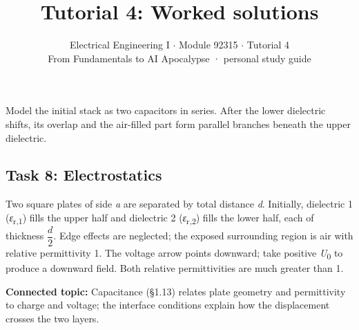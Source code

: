 \documentclass[11pt]{article}
\title{\sffamily\bfseries\color{FAUblue}Tutorial 4: Worked solutions}
\author{Electrical Engineering I \ensuremath{\cdot} Module 92315 \ensuremath{\cdot} Tutorial 4\\[2pt]\small From Fundamentals to AI Apocalypse · personal study guide}
\date{}
\begin{document}
\maketitle
\begingroup\footnotesize\setlength{\parskip}{0pt}\tableofcontents\endgroup
\clearpage

{\large Model the initial stack as two capacitors in series. After the lower dielectric shifts, its overlap and the air-filled part form parallel branches beneath the upper dielectric.}


\begin{keepsection}
\section{Task 8: Electrostatics}

Two square plates of side \textit{a} are separated by total distance \textit{d}. Initially, dielectric 1 (\textit{ε}\textsubscript{r,1}) fills the upper half and dielectric 2 (\textit{ε}\textsubscript{r,2}) fills the lower half, each of thickness {\small\ensuremath{\dfrac{{d}}{2}}}. Edge effects are neglected; the exposed surrounding region is air with relative permittivity 1. The voltage arrow points downward; take positive \textit{U}\textsubscript{0} to produce a downward field. Both relative permittivities are much greater than 1.

\textbf{Connected topic:} Capacitance (§1.13) relates plate geometry and permittivity to charge and voltage; the interface conditions explain how the displacement crosses the two layers.


\end{keepsection}
\end{document}
